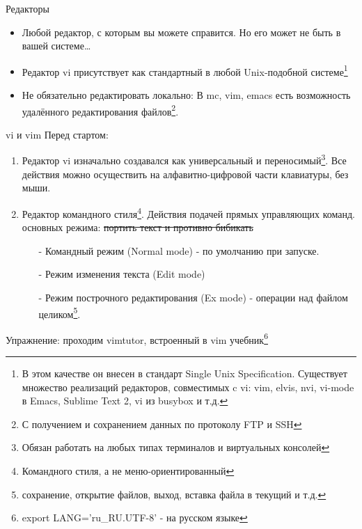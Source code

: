 \begin{frame}{Редакторы}

  \begin{itemize}
    \item  Любой редактор, с которым вы можете справится. \pause Но его может не быть в вашей системе\ldots \pause
    \item Редактор \alert{vi} присутствует как стандартный в любой Unix-подобной системе\footnote{В этом качестве он внесен в стандарт Single Unix Specification. Существует множество реализаций редакторов, совместимых c vi: vim, elvis, nvi, vi-mode в Emacs, Sublime Text 2, vi из busybox и т.д.} \pause
    \item Не обязательно редактировать локально: В \alert{mc}, \alert{vim}, \alert{emacs} есть возможность удалённого редактирования файлов\footnote{С получением и сохранением данных по протоколу FTP и SSH}.
  \end{itemize}

\end{frame}

\begin{frame}{vi и vim}
  Перед стартом:

  \begin{enumerate}
    \item  Редактор vi изначально создавался как универсальный и переносимый\footnote{Обязан работать на любых типах терминалов и виртуальных консолей}. Все действия можно осуществить на алфавитно-цифровой части клавиатуры, без мыши. \pause
    \item \alert{Редактор командного стиля}\footnote{Командного стиля, а не меню-ориентированный}. Действия подачей прямых управляющих команд. \pause {} основных режима: \sout{портить текст и противно бибикать}
      \begin{itemize}
        \item[-] \alert{Командный режим} (Normal mode) - по умолчанию при запуске.
        \item[-] \alert{Режим изменения текста} (Edit mode)
        \item[-] \alert{Режим построчного редактирования} (Ex mode) - операции над файлом целиком\footnote{сохранение, открытие файлов, выход, вставка файла в текущий и т.д.}.
      \end{itemize}
  \end{enumerate} \pause
  \alert{Упражнение}: проходим \alert{vimtutor}, встроенный в vim учебник\footnote{ export LANG='ru\_RU.UTF-8' - на русском языке }
\end{frame}

